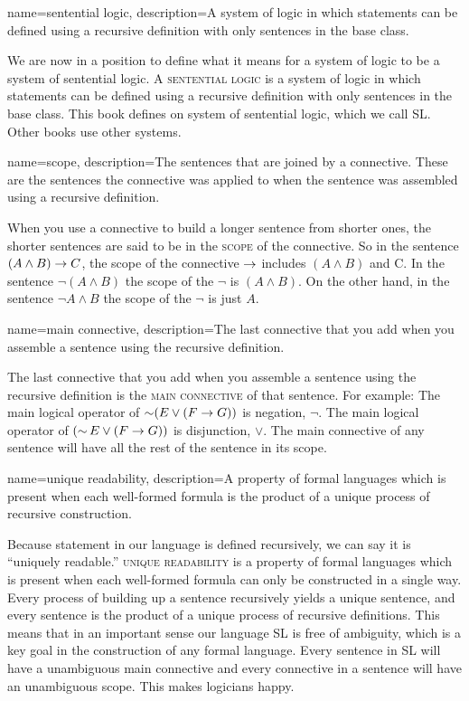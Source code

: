 {
{
name=sentential logic,
description={A system of logic in which statements can be defined using a recursive definition with only sentences in the base class.}
}


We are now in a position to define what it means for a system of logic to be a system of sentential logic. A \textsc{\gls{sentential logic}} \label{def:sentential_logic} is a system of logic in which statements can be defined using a recursive definition with only sentences in the base class. This book defines on system of sentential logic, which we call SL. Other books use other systems.


{
name=scope,
description={The sentences that are joined by a connective. These are the sentences the connective was applied to when the sentence was assembled using a recursive definition.}
}

When you use a connective to build a longer sentence from shorter ones, the shorter sentences are said to be in the \textsc{\gls{scope}} \label{def:scope} of the connective. So in the sentence $(A \land B) \mathrel{\rightarrow} C$, the scope of the connective $\mathrel{\rightarrow}$ includes $(A \land B)$ and C. In the sentence $\lnot(A \land B)$ the scope of the $\lnot$ is $(A \land B)$. On the other hand, in the sentence $\lnot A \land B$ the scope of the $\lnot$ is just $A$.

{
name=main connective,
description={The last connective that you add when you assemble a sentence using the recursive definition.}
}

The last connective that you add when you assemble a sentence using the recursive definition is the \textsc{\gls{main connective}} \label{def:main_connective} of that sentence. For example: The main logical operator of $\mathop{\sim} (E \lor (F \mathrel{\rightarrow} G))$ is negation, $\lnot$. The main logical operator of $(\mathop{\sim} E \lor (F \mathrel{\rightarrow} G))$ is disjunction, $\lor$. The main connective of any sentence will have all the rest of the sentence in its scope.

{
name=unique readability,
description={A property of formal languages which is present when each well-formed formula is the product of a unique process of recursive construction.}
}

Because statement in our language is defined recursively, we can say it is ``uniquely readable.'' \textsc{\Gls{unique readability}}\label{def:unique_readability} is a property of formal languages which is present when each well-formed formula can only be constructed in a single way. Every process of building up a sentence recursively yields a unique sentence, and every sentence is the product of a unique process of recursive definitions. This means that in an important sense our language SL is free of ambiguity, which is a key goal in the construction of any formal language. Every sentence in SL will have a unambiguous main connective and every connective in a sentence will have an unambiguous scope. This makes logicians happy.


}
